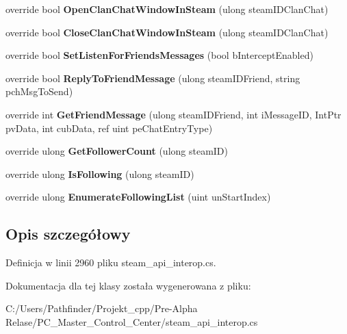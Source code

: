 \begin{DoxyCompactItemize}
override bool {\bfseries Open\+Clan\+Chat\+Window\+In\+Steam} (ulong steam\+I\+D\+Clan\+Chat)
\item 
\mbox{\label{class_valve_1_1_steamworks_1_1_c_steam_friends_abe0011e77a75eb8cd030e387e6aa629e}} 
override bool {\bfseries Close\+Clan\+Chat\+Window\+In\+Steam} (ulong steam\+I\+D\+Clan\+Chat)
\item 
\mbox{\label{class_valve_1_1_steamworks_1_1_c_steam_friends_ac133e88d80da784a15715cfc3ad453b4}} 
override bool {\bfseries Set\+Listen\+For\+Friends\+Messages} (bool b\+Intercept\+Enabled)
\item 
\mbox{\label{class_valve_1_1_steamworks_1_1_c_steam_friends_ab01a812806884d0b436d6988d6a9ff20}} 
override bool {\bfseries Reply\+To\+Friend\+Message} (ulong steam\+I\+D\+Friend, string pch\+Msg\+To\+Send)
\item 
\mbox{\label{class_valve_1_1_steamworks_1_1_c_steam_friends_a0f29fe1765c1c7908f279303fa8c9fdb}} 
override int {\bfseries Get\+Friend\+Message} (ulong steam\+I\+D\+Friend, int i\+Message\+ID, Int\+Ptr pv\+Data, int cub\+Data, ref uint pe\+Chat\+Entry\+Type)
\item 
\mbox{\label{class_valve_1_1_steamworks_1_1_c_steam_friends_ad05683d1715776c6a23912ba313d9fd4}} 
override ulong {\bfseries Get\+Follower\+Count} (ulong steam\+ID)
\item 
\mbox{\label{class_valve_1_1_steamworks_1_1_c_steam_friends_a0916306df5ee5d6248356b2200e615b5}} 
override ulong {\bfseries Is\+Following} (ulong steam\+ID)
\item 
\mbox{\label{class_valve_1_1_steamworks_1_1_c_steam_friends_adb4c13946893c86cc75842fea7ae3402}} 
override ulong {\bfseries Enumerate\+Following\+List} (uint un\+Start\+Index)
\end{DoxyCompactItemize}


\subsection{Opis szczegółowy}


Definicja w linii 2960 pliku steam\+\_\+api\+\_\+interop.\+cs.



Dokumentacja dla tej klasy została wygenerowana z pliku\+:\begin{DoxyCompactItemize}
\item 
C\+:/\+Users/\+Pathfinder/\+Projekt\+\_\+cpp/\+Pre-\/\+Alpha Relase/\+P\+C\+\_\+\+Master\+\_\+\+Control\+\_\+\+Center/steam\+\_\+api\+\_\+interop.\+cs\end{DoxyCompactItemize}
